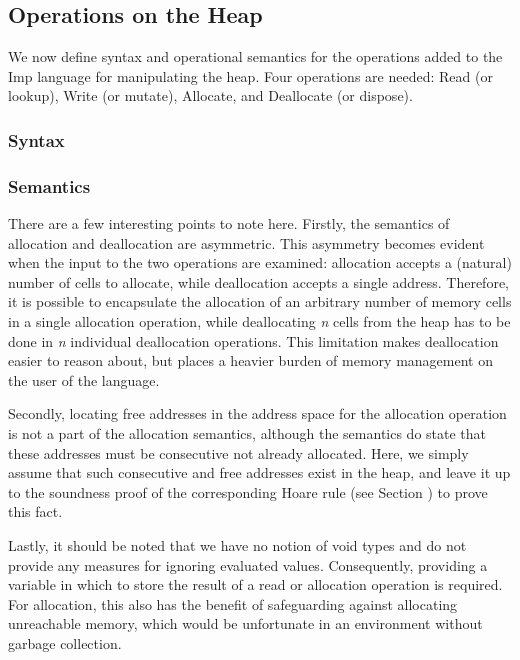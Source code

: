 \subsection{Operations on the Heap}
We now define syntax and operational semantics for the operations added to the Imp language for manipulating the heap. Four operations are needed: Read (or lookup), Write (or mutate), Allocate, and Deallocate (or dispose).
\subsubsection{Syntax} 
\subsubsection{Semantics}
There are a few interesting points to note here. Firstly, the semantics of allocation and deallocation are asymmetric. This asymmetry becomes evident when the input to the two operations are examined: allocation accepts a (natural) number of cells to allocate, while deallocation accepts a single address. Therefore, it is possible to encapsulate the allocation of an arbitrary number of memory cells in a single allocation operation, while deallocating {\it n} cells from the heap has to be done in {\it n} individual deallocation operations. This limitation makes deallocation easier to reason about, but places a heavier burden of memory management on the user of the language.

Secondly, locating free addresses in the address space for the allocation operation is not a part of the allocation semantics, although the semantics do state that these addresses must be consecutive not already allocated.  Here, we simply assume that such consecutive and free addresses exist in the heap, and leave it up to the soundness proof of the corresponding Hoare rule (see Section ) to prove this fact.

Lastly, it should be noted that we have no notion of void types and do not provide any measures for ignoring evaluated values. Consequently, providing a variable in which to store the result of a read or allocation operation is required. For allocation, this also has the benefit of safeguarding against allocating unreachable memory, which would be unfortunate in an environment without garbage collection.

